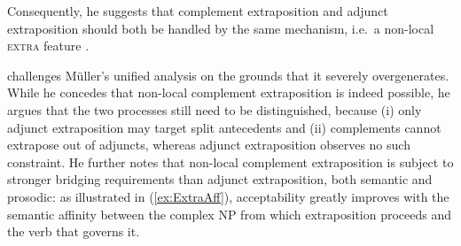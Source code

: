 \documentclass[output=paper
,notxmath 
	        ,collection
	        ,collectionchapter
 	        ,biblatex
                ,babelshorthands
                ,newtxmath
                ,draftmode
                ,colorlinks, citecolor=brown
]{langscibook}
\begin{document}
\z

Consequently, he suggests that complement extraposition and adjunct
extraposition should both be handled by the same mechanism, i.e.\ a
non-local \textsc{extra} feature \citep{Keller:95,Mueller99a}.

\citet{crysmann_b09xtra} challenges Müller's unified analysis on the
grounds that it severely overgenerates.  While he concedes that
non-local complement extraposition is indeed possible, he argues that
the two processes still need to be distinguished, because (i) only
adjunct extraposition may target split antecedents and (ii)
complements cannot extrapose out of adjuncts, whereas adjunct
extraposition observes no such constraint.  He further notes that
non-local complement extraposition is subject to stronger bridging
requirements than adjunct extraposition, both semantic and prosodic:
as illustrated in (\ref{ex:ExtraAff}), acceptability greatly improves
with the semantic affinity between the complex NP from which
extraposition proceeds and the verb that governs it.

\eal
\label{ex:ExtraAff}
\zl
\end{document}
